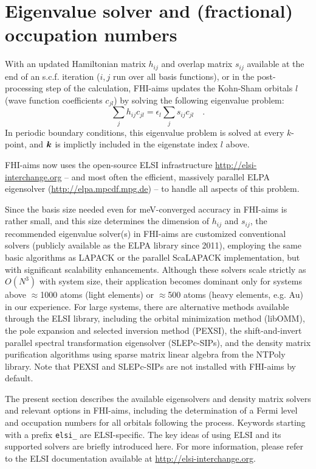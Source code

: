 \section{Eigenvalue solver and (fractional) occupation numbers}
\label{Sec:EV}

With an updated Hamiltonian matrix $h_{ij}$ and overlap matrix $s_{ij}$
available at the end of an s.c.f. iteration ($i,j$ run over all basis
functions), or in the post-processing step of the calculation, FHI-aims updates
the Kohn-Sham orbitals $l$ (wave function coefficients $c_{jl}$) by solving the
following eigenvalue problem:
\begin{equation}\label{Eq:EVP}
  \sum_j h_{ij} c_{jl} = \epsilon_l \sum_j s_{ij} c_{jl} \quad .
\end{equation}
In periodic boundary conditions, this eigenvalue problem is solved at every
$k$-point, and $\mbox{\boldmath$k$}$ is implictly included in the eigenstate index $l$ above.

FHI-aims now uses the open-source ELSI infrastructure
\url{http://elsi-interchange.org} -- and most often the efficient, massively
parallel ELPA eigensolver (\url{http://elpa.mpcdf.mpg.de}) -- to handle all
aspects of this problem.

Since the basis size needed even for meV-converged accuracy in FHI-aims is
rather small, and this size determines the dimension of $h_{ij}$ and $s_{ij}$,
the recommended eigenvalue solver(s) in FHI-aims are customized conventional
solvers (publicly available as the ELPA library since 2011), employing the same
basic algorithms as LAPACK or the parallel ScaLAPACK implementation, but with
significant scalability enhancements. Although these solvers scale strictly as
$O(N^3)$ with system size, their application becomes dominant only for systems
above $\approx$1000 atoms (light elements) or $\approx$500 atoms (heavy
elements, e.g. Au) in our experience. For large systems, there are alternative
methods available through the ELSI library, including the orbital minimization
method (libOMM), the pole expansion and selected inversion method (PEXSI), the
shift-and-invert parallel spectral transformation eigensolver (SLEPc-SIPs), and
the density matrix purification algorithms using sparse matrix linear algebra
from the NTPoly library. Note that PEXSI and SLEPc-SIPs are not installed with
FHI-aims by default.

The present section describes the available eigensolvers and density matrix
solvers and relevant options in FHI-aims, including the determination of a Fermi
level and occupation numbers for all orbitals following the process. Keywords
starting with a prefix \texttt{elsi\_} are ELSI-specific. The key ideas of using
ELSI and its supported solvers are briefly introduced here. For more
information, please refer to the ELSI documentation available at
\url{http://elsi-interchange.org}.

